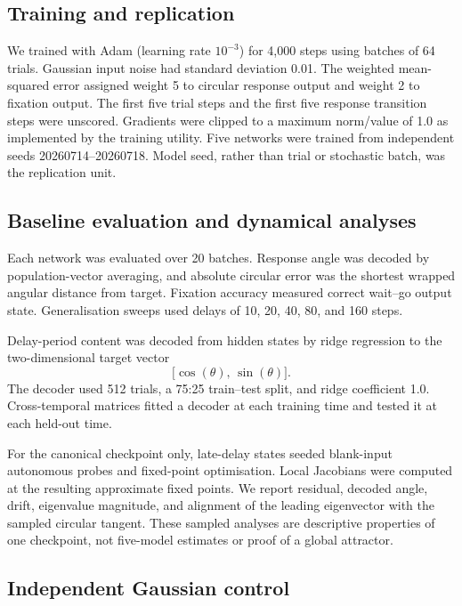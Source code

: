 \documentclass[12pt,a4paper]{article}
\begin{document}
\subsection{Training and replication}

We trained with Adam (learning rate $10^{-3}$) for 4,000 steps using batches of
64 trials. Gaussian input noise had standard deviation 0.01. The weighted
mean-squared error assigned weight 5 to circular response output and weight 2
to fixation output. The first five trial steps and the first five response
transition steps were unscored. Gradients were clipped to a maximum norm/value
of 1.0 as implemented by the training utility. Five networks were trained from
independent seeds 20260714--20260718. Model seed, rather than trial or
stochastic batch, was the replication unit.

\subsection{Baseline evaluation and dynamical analyses}

Each network was evaluated over 20 batches. Response angle was decoded by
population-vector averaging, and absolute circular error was the shortest
wrapped angular distance from target. Fixation accuracy measured correct
wait--go output state. Generalisation sweeps used delays of 10, 20, 40, 80, and
160 steps.

Delay-period content was decoded from hidden states by ridge regression to the
two-dimensional target vector
\[
  \bigl[\cos(\theta),\,\sin(\theta)\bigr].
\]
The decoder used 512 trials, a 75:25
train--test split, and ridge coefficient 1.0. Cross-temporal matrices fitted a
decoder at each training time and tested it at each held-out time.

For the canonical checkpoint only, late-delay states seeded blank-input
autonomous probes and fixed-point optimisation. Local Jacobians were computed
at the resulting approximate fixed points. We report residual, decoded angle,
drift, eigenvalue magnitude, and alignment of the leading eigenvector with the
sampled circular tangent. These sampled analyses are descriptive properties of
one checkpoint, not five-model estimates or proof of a global attractor.

\subsection{Independent Gaussian control}
\end{document}
